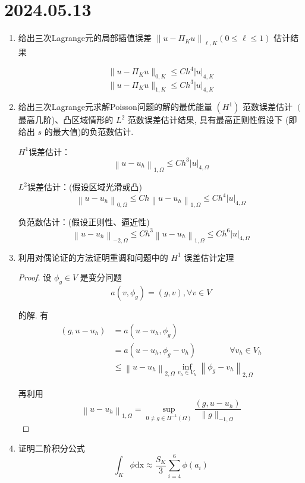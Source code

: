 \documentclass[12pt,a4paper]{article}
\begin{document}
	
	\noindent
	
	\section*{2024.05.13}	
	
	\begin{enumerate}
		\item 给出三次Lagrange元的局部插值误差 $\left\|u-\Pi_K u\right\|_{\ell, K}(0 \leq \ell \leq 1)$ 估计结果
		
		$$
		\|u - \Pi_K u\|_{0,K} \leq C h^4 |u|_{4,K} $$
		$$
		\|u - \Pi_K u\|_{1,K} \leq C h^3 |u|_{4,K}
		$$
		
		\item 给出三次Lagrange元求解Poisson问题的解的最优能量 $\left(H^1\right)$ 范数误差估计 $\left(\right.$ 最高几阶)、凸区域情形的 $L^2$ 范数误差估计结果, 具有最高正则性假设下 (即给出 $s$ 的最大值)的负范数估计.
		
		$H^1$误差估计：
		$$
		\left\|u-u_h\right\|_{1,\Omega}\leq Ch^3\left|u\right|_{4,\Omega}
		$$
		
		$L^2$误差估计：(假设区域光滑或凸)
		$$
		\left\|u-u_h\right\|_{0,\Omega}\leq Ch\left\|u-u_h\right\|_{1,\Omega}\leq Ch^4\left|u\right|_{4,\Omega}
		$$
		
		负范数估计：(假设正则性、逼近性)
		$$
		\left\|u-u_h\right\|_{-2,\Omega}\leq Ch^{3}\left\|u-u_h\right\|_{1,\Omega}\leq Ch^6\left|u\right|_{4,\Omega}
		$$
		
		\item 利用对偶论证的方法证明重调和问题中的 $H^1$ 误差估计定理
		
		\begin{proof}
			设 $\phi_g \in V$ 是变分问题
			$$
			a\left(v, \phi_g\right)=(g, v), \forall v \in V
			$$
			
			的解. 有
			$$
			\begin{aligned}
				\left(g, u-u_h\right) & =a\left(u-u_h, \phi_g\right) \\
				& = a\left(u-u_h, \phi_g-v_h\right) \qquad \qquad  \forall v_h \in V_h \\
				& \leq\left\|u-u_h\right\|_{2, \Omega} \inf _{v_h \in V_h}\left\|\phi_g-v_h\right\|_{2, \Omega}
			\end{aligned}
			$$
			
			再利用
			$$
			\left\|u-u_h\right\|_{1, \Omega}=\sup _{0 \neq g \in H^{-1}(\Omega)} \frac{\left(g, u-u_h\right)}{\|g\|_{-1, \Omega}}
			$$
		\end{proof}
		
		\item 证明二阶积分公式
		$$
		\int_K \phi \mathrm{dx} \approx \frac{S_K}{3} \sum_{i=4}^6 \phi\left(a_i\right)
		$$
		

\end{enumerate}
\end{document}
